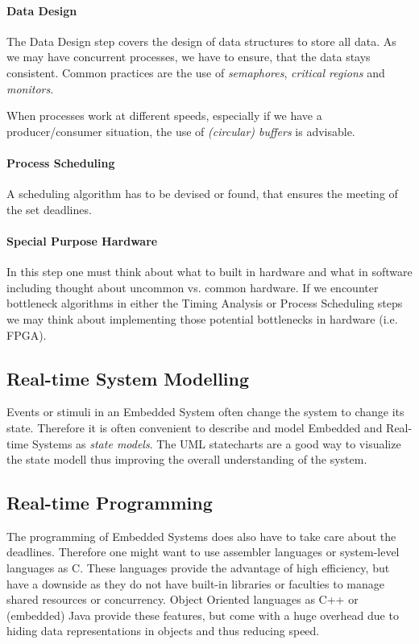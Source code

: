 \documentclass[10pt,a4paper,titlepage,draft]{article} %
\begin{document}
\paragraph{Data Design}
The Data Design step covers the design of data structures to store all data.
As we may have concurrent processes, we have to ensure, that the data stays consistent.
Common practices are the use of \emph{semaphores}, \emph{critical regions} and \emph{monitors}.

When processes work at different speeds, especially if we have a pro\-du\-cer/con\-sumer situation, the use of \emph{(circular) buffers} is advisable.

\paragraph{Process Scheduling}
A scheduling algorithm has to be devised or found, that ensures the meeting of the set deadlines.

\paragraph{Special Purpose Hardware}
In this step one must think about what to built in hardware and what in software including thought about uncommon vs. common hardware.
If we encounter bottleneck algorithms in either the Timing Analysis or Process Scheduling steps we may think about implementing those potential bottlenecks in hardware (i.e. FPGA).

\subsection{Real-time System Modelling}
Events or stimuli in an Embedded System often change the system to change its state.
Therefore it is often convenient to describe and model Embedded and Real-time Systems as \emph{state models}.
The UML statecharts are a good way to visualize the state modell thus improving the overall understanding of the system.

\subsection{Real-time Programming}
The programming of Embedded Systems does also have to take care about the deadlines.
Therefore one might want to use assembler languages or system-level languages as C.
These languages provide the advantage of high efficiency, but have a downside as they do not have built-in libraries or faculties to manage shared resources or concurrency.
Object Oriented languages as C++ or (embedded) Java provide these features, but come with a huge overhead due to hiding data representations in objects and thus reducing speed.
\end{document}
